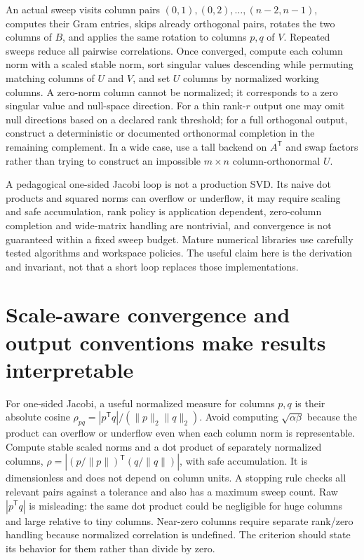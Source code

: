 An actual sweep visits column pairs \((0,1),(0,2),\ldots,(n-2,n-1)\), computes their Gram entries, skips already orthogonal pairs, rotates the two columns of \(B\), and applies the same rotation to columns \(p,q\) of \(V\). Repeated sweeps reduce all pairwise correlations. Once converged, compute each column norm with a scaled stable norm, sort singular values descending while permuting matching columns of \(U\) and \(V\), and set \(U\) columns by normalized working columns. A zero-norm column cannot be normalized; it corresponds to a zero singular value and null-space direction. For a thin rank-\(r\) output one may omit null directions based on a declared rank threshold; for a full orthogonal output, construct a deterministic or documented orthonormal completion in the remaining complement. In a wide case, use a tall backend on \(A^\mathsf T\) and swap factors rather than trying to construct an impossible \(m\times n\) column-orthonormal \(U\).

A pedagogical one-sided Jacobi loop is not a production SVD. Its naive dot products and squared norms can overflow or underflow, it may require scaling and safe accumulation, rank policy is application dependent, zero-column completion and wide-matrix handling are nontrivial, and convergence is not guaranteed within a fixed sweep budget. Mature numerical libraries use carefully tested algorithms and workspace policies. The useful claim here is the derivation and invariant, not that a short loop replaces those implementations.

\section{Scale-aware convergence and output conventions make results interpretable}\label{02-foundations-ii-ch038-scale-aware-convergence-and-output-conventions-make-results-interpretable}

\hypertarget{02-foundations-ii-ch038-scale-aware-convergence-and-output-conventions-make-results-interpretable}{}

For one-sided Jacobi, a useful normalized measure for columns \(p,q\) is their absolute cosine \(\rho_{pq}=|p^\mathsf Tq|/(\|p\|_2\|q\|_2)\). Avoid computing \(\sqrt{\alpha\beta}\) because the product can overflow or underflow even when each column norm is representable. Compute stable scaled norms and a dot product of separately normalized columns, \(\rho=|(p/\|p\|)^\mathsf T(q/\|q\|)|\), with safe accumulation. It is dimensionless and does not depend on column units. A stopping rule checks all relevant pairs against a tolerance and also has a maximum sweep count. Raw \(|p^\mathsf Tq|\) is misleading: the same dot product could be negligible for huge columns and large relative to tiny columns. Near-zero columns require separate rank/zero handling because normalized correlation is undefined. The criterion should state its behavior for them rather than divide by zero.

